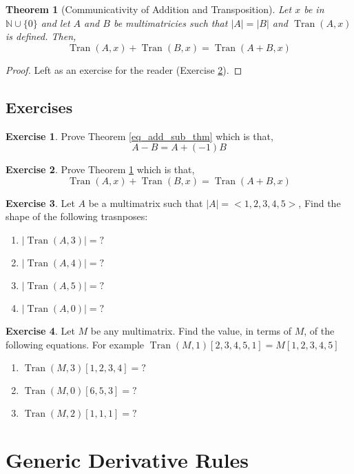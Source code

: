\documentclass[12pt]{book}
\theoremstyle{plain}
\newtheorem{theorem}{Theorem}[chapter]
\theoremstyle{definition}
\newtheorem{exercise}{Exercise}[chapter]
\theoremstyle{ppart}
\theoremstyle{case}
\theoremstyle{solution}
\DeclareMathOperator{\Tran}{Tran}
\begin{document}
\begin{theorem}[Communicativity of Addition and Transposition]
\label{com_add_tran_thm}
Let $x$ be in $\mathbb{N} \cup \{0\}$ and let $A$ and $B$ be
multimatricies such that $|A| = |B|$ and $\Tran(A, x)$ is defined.
Then,
\[ \Tran(A, x) + \Tran(B, x) = \Tran(A+B, x) \]
\end{theorem}
\begin{proof}
Left as an exercise for the reader (Exercise \ref{com_add_tran_ex}).
\end{proof}

\section{Exercises}

\begin{exercise}
\label{eq_add_sub_ex}
Prove Theorem \ref{eq_add_sub_thm} which is that,
\[ A - B = A + (-1)B \]
\end{exercise}

\begin{exercise}
\label{com_add_tran_ex}
Prove Theorem \ref{com_add_tran_thm} which is that,
\[ \Tran(A, x) + \Tran(B, x) = \Tran(A+B, x) \]
\end{exercise}

\begin{exercise}
Let $A$ be a multimatrix such that $|A| = <1,2,3,4,5>$,
Find the shape of the following trasnposes:
\begin{enumerate}
\item $|\Tran(A, 3)| = ?$
\item $|\Tran(A, 4)| = ?$
\item $|\Tran(A, 5)| = ?$
\item $|\Tran(A, 0)| = ?$
\end{enumerate}
\end{exercise}

\begin{exercise}
Let $M$ be any multimatrix.
Find the value, in terms of $M$, of the following equations.
For example $\Tran(M, 1)[2,3,4,5,1] = M[1,2,3,4,5]$
\begin{enumerate}
\item $\Tran(M, 3)[1,2,3,4] = ?$
\item $\Tran(M, 0)[6,5,3] = ?$
\item $\Tran(M, 2)[1,1,1] = ?$
\end{enumerate}
\end{exercise}

\chapter{Generic Derivative Rules}
\end{document}
